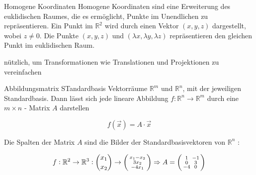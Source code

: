 \begin{definition}{Homogene Koordinaten}
    Homogene Koordinaten sind eine Erweiterung des euklidischen Raumes, die es ermöglicht, Punkte im Unendlichen zu repräsentieren.
    Ein Punkt im $\mathbb{R}^2$ wird durch einen Vektor $(x, y, z)$ dargestellt, wobei $z\neq 0$.
    Die Punkte $(x, y, z)$ und $(\lambda x, \lambda y, \lambda z)$ repräsentieren den gleichen Punkt im euklidischen Raum.
    
    {\small nützlich, um Transformationen wie Translationen und Projektionen zu vereinfachen}
\end{definition}

\begin{definition}{Abbildungsmatrix STandardbasis}
    Vektorräume $\mathbb{R}^{m}$ und $\mathbb{R}^{n}$, mit der jeweiligen Standardbasis. Dann lässt sich jede lineare Abbildung $f: \mathbb{R}^{n} \rightarrow \mathbb{R}^{m}$ durch eine $m \times n$ - Matrix $A$ darstellen

    $$
    f(\vec{x})=A \cdot \vec{x}
    $$

    Die Spalten der Matrix $A$ sind die Bilder der Standardbasisvektoren von $\mathbb{R}^{n}$ :

    \begin{center}
    \end{center}
\end{definition}

\begin{example}
    $$
    f: \mathbb{R}^{2} \rightarrow \mathbb{R}^{3}:\binom{x_{1}}{x_{2}} \rightarrow \begin{psmallmatrix} x_{1}-x_{2} \\ 3 x_{2} \\ -4 x_{1} \end{psmallmatrix}
    \Rightarrow A = \begin{psmallmatrix} 1 & -1 \\ 0 & 3 \\ -4 & 0 \end{psmallmatrix}
    $$
\end{example}

